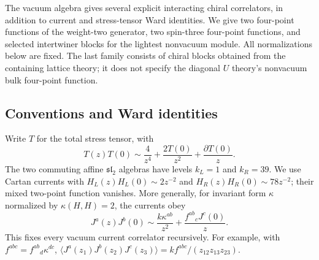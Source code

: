 \documentclass[11pt,a4paper]{article}
\theoremstyle{definition}
\begin{document}
The vacuum algebra gives several explicit interacting chiral correlators,
in addition to current and stress-tensor Ward identities.  We give two
four-point functions of the weight-two generator, two spin-three four-point
functions, and selected intertwiner blocks for the lightest nonvacuum
module.  All normalizations below are fixed.  The last family consists of
chiral blocks obtained from the containing lattice theory; it does not
specify the diagonal $U$ theory's nonvacuum bulk four-point function.

\subsection{Conventions and Ward identities}

Write $T$ for the total stress tensor, with
\begin{equation}
 T(z)T(0)\sim \frac{4}{z^4}+\frac{2T(0)}{z^2}
                   +\frac{\partial T(0)}{z}.
\end{equation}
The two commuting affine $\mathfrak{sl}_2$ algebras have levels
$k_L=1$ and $k_R=39$.  We use Cartan currents with
$H_L(z)H_L(0)\sim2z^{-2}$ and
$H_R(z)H_R(0)\sim78z^{-2}$; their mixed two-point function vanishes.
More generally, for invariant form $\kappa$ normalized by
$\kappa(H,H)=2$, the currents obey
\begin{equation}
 J^a(z)J^b(0)\sim\frac{k\kappa^{ab}}{z^2}
               +\frac{f^{ab}{}_cJ^c(0)}{z}.
\end{equation}
This fixes every vacuum current correlator recursively.  For example,
with $f^{abc}=f^{ab}{}_d\kappa^{dc}$,
$\langle J^a(z_1)J^b(z_2)J^c(z_3)\rangle
=k f^{abc}/(z_{12}z_{13}z_{23})$.
\end{document}
